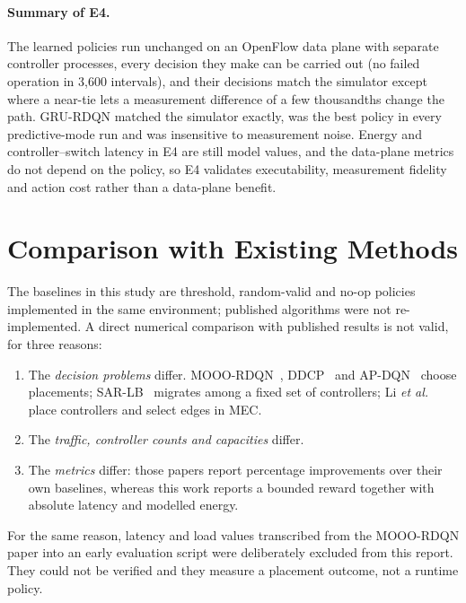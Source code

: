 \paragraph{Summary of E4.} The learned policies run unchanged on an OpenFlow data plane with separate controller processes, every decision they make can be carried out (no failed operation in 3,600 intervals), and their decisions match the simulator except where a near-tie lets a measurement difference of a few thousandths change the path. GRU-RDQN matched the simulator exactly, was the best policy in every predictive-mode run and was insensitive to measurement noise. Energy and controller--switch latency in E4 are still model values, and the data-plane metrics do not depend on the policy, so E4 validates executability, measurement fidelity and action cost rather than a data-plane benefit.

\section{Comparison with Existing Methods}
\label{sec:compare-existing}

The baselines in this study are threshold, random-valid and no-op policies implemented in the same environment; published algorithms were not re-implemented. A direct numerical comparison with published results is not valid, for three reasons:
\begin{enumerate}[leftmargin=*]
  \item The \emph{decision problems} differ. MOOO-RDQN~\cite{chen2025mooo}, DDCP~\cite{bouzidi2022ddcp} and AP-DQN~\cite{farahi2026apdqn} choose placements; SAR-LB~\cite{yeo2021sarlb} migrates among a fixed set of controllers; Li \emph{et al.}~\cite{li2024mec} place controllers and select edges in MEC.
  \item The \emph{traffic, controller counts and capacities} differ.
  \item The \emph{metrics} differ: those papers report percentage improvements over their own baselines, whereas this work reports a bounded reward together with absolute latency and modelled energy.
\end{enumerate}
For the same reason, latency and load values transcribed from the MOOO-RDQN paper into an early evaluation script were deliberately excluded from this report. They could not be verified and they measure a placement outcome, not a runtime policy.

